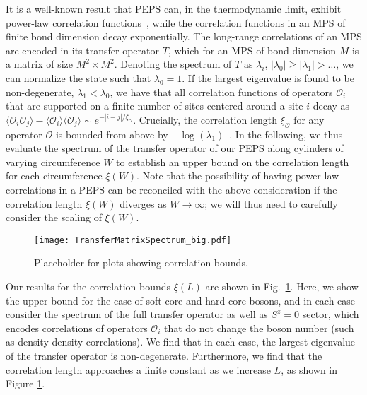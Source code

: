 It is a well-known result that PEPS can, in the thermodynamic limit,
exhibit power-law correlation functions~\cite{?}, while the correlation
functions in an MPS of finite bond dimension decay exponentially. The
long-range correlations of an MPS are encoded in its transfer operator $T$,
which for an MPS of bond dimension $M$ is a matrix of size $M^2 \times M^2$.
Denoting the spectrum of $T$ as $\lambda_i$, $|\lambda_0| \geq |\lambda_1| > \ldots$,
we can normalize the state such that $\lambda_0 = 1$. If the largest eigenvalue
is found to be non-degenerate, $\lambda_1 < \lambda_0$, we have that all correlation
functions of operators $\mathcal{O}_i$ that are supported on a finite number of sites centered
around a site $i$ decay as
$\langle \mathcal{O}_i \mathcal{O}_j \rangle - \langle \mathcal{O}_i \rangle \langle \mathcal{O}_j \rangle \sim e^{-|i-j|/\xi_\mathcal{O}}$.
Crucially, the correlation length $\xi_\mathcal{O}$ for any operator $\mathcal{O}$
is bounded from above by $-\log(\lambda_1)$~\cite{?}. In the following, we thus
evaluate the spectrum of the transfer operator of our PEPS along cylinders of varying
circumference $W$ to establish an upper bound on the correlation length for each
circumference $\xi(W)$.
Note that the possibility of having power-law correlations in a PEPS can
be reconciled with the above consideration if the correlation length $\xi(W)$
diverges as $W \rightarrow \infty$; we will thus need to carefully consider the scaling
of $\xi(W)$.

\begin{figure}[hbtc]
	\centering
	\texttt{[image: TransferMatrixSpectrum\_big.pdf]}
	\caption{Placeholder for plots showing correlation bounds.}
	\label{fig:TMS}
\end{figure}

Our results for the correlation bounds $\xi(L)$ are shown in Fig.~\ref{fig:TMS}.
Here, we show the upper bound for the case of soft-core and hard-core bosons,
and in each case consider the spectrum of the full transfer operator as well
as $S^z=0$ sector, which encodes correlations of operators $\mathcal{O}_i$ that do not
change the boson number (such as density-density correlations).
We find that in each case, the largest eigenvalue of the transfer operator is
non-degenerate. Furthermore, we find
that the correlation length approaches a finite constant as we
increase $L$, as shown in Figure \ref{fig:TMS}.
